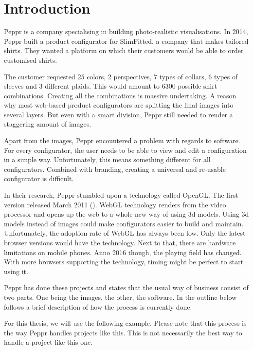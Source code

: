 \chapter{Introduction}

Peppr is a company specialising in building photo-realistic visualisations. In 2014, Peppr built a product configurator for SlimFitted, a company that makes tailored shirts. They wanted a platform on which their customers would be able to order customised shirts.

The customer requested 25 colors, 2 perspectives, 7 types of collars, 6 types of sleeves and 3 different plaids. This would amount to 6300 possible shirt combinations. Creating all the combinations is massive undertaking. A reason why most web-based product configurators are splitting the final images into several layers. But even with a smart division, Peppr still needed to render a staggering amount of images.

Apart from the images, Peppr encountered a problem with regards to software. For every configurator, the user needs to be able to view and edit a configuration in a simple way. Unfortunately, this means something different for all configurators. Combined with branding, creating a universal and re-usable configurator is difficult.

In their research, Peppr stumbled upon a technology called OpenGL. The first version released March 2011 (\citet{OpenGL Website}). WebGL technology renders from the video processor and opens up the web to a whole new way of using 3d models. Using 3d models instead of images could make configurators easier to build and maintain. Unfortunately, the adoption rate of WebGL has always been low. Only the latest browser versions would have the technology. Next to that, there are hardware limitations on mobile phones. Anno 2016 though, the playing field has changed. With more browsers supporting the technology, timing might be perfect to start using it.

Peppr has done these projects and states that the usual way of business consist of two parts. One being the images, the other, the software. In the outline below follows a brief description of how the process is currently done. 

For this thesis, we will use the following example. Please note that this process is the way Peppr handles projects like this. This is not necessarily the best way to handle a project like this one.
\newline
{}

